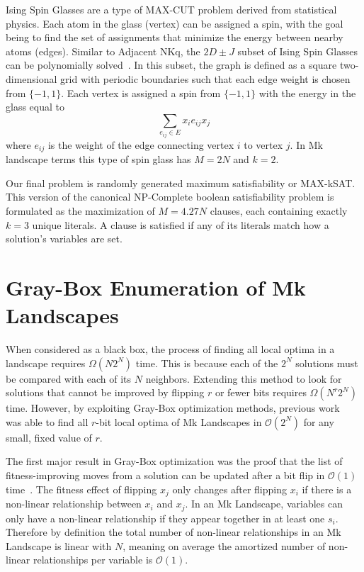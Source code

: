 \documentclass[runningheads,a4paper]{llncs}
\newcommand{\BigO}[1]{$\mathcal{O}{(#1)}$}
\begin{document}
Ising Spin Glasses are a type of MAX-CUT problem derived from statistical physics.
Each atom in the glass (vertex) can be assigned a spin, with the goal being to
find the set of assignments that minimize the energy between nearby atoms (edges).
Similar to Adjacent NKq, the $2D\pm J$ subset of Ising Spin Glasses can be polynomially
solved~\cite{saul:1994:spinglass}.
In this subset, the graph is defined as a square two-dimensional grid with
periodic boundaries such that each edge
weight is chosen from $\{-1, 1\}$. Each vertex is assigned a spin from $\{-1, 1\}$ with
the energy in the glass equal to
\begin{equation}
\sum_{e_{ij} \in E} x_ie_{ij}x_j
  \label{eq-ising}
\end{equation}
where $e_{ij}$ is the weight of the edge connecting vertex $i$ to vertex $j$. In Mk landscape terms
this type of spin glass has $M=2N$ and $k=2$.

Our final problem is randomly generated maximum satisfiability or MAX-kSAT.
This version of the canonical NP-Complete boolean satisfiability problem is formulated
as the maximization of $M=4.27N$ clauses, each containing exactly $k=3$ unique literals.
A clause is satisfied if any of its literals match how a solution's variables are set.

\section{Gray-Box Enumeration of Mk Landscapes}
\label{sec-gray-box}
When considered as a black box, the process of finding all local optima
in a landscape requires $\Omega(N2^N)$ time. This is because each
of the $2^N$ solutions must be compared with each of its $N$ neighbors.
Extending this method to look for solutions that cannot be improved by
flipping $r$ or fewer bits requires $\Omega(N^r2^N)$ time. However,
by exploiting Gray-Box optimization methods, previous work~\cite{ochoa:2015:crossovernetworks}
was able to find all $r$-bit local optima of Mk Landscapes in \BigO{2^N} for any small,
fixed value of $r$.

The first major result in Gray-Box optimization was the proof that the list
of fitness-improving moves from a solution can be updated after a bit flip in \BigO{1}
time~\cite{whitley:2012:constant}.
The fitness effect of flipping $x_j$ only changes after flipping $x_i$ if
there is a non-linear relationship between $x_i$ and $x_j$.
In an Mk Landscape, variables
can only have a non-linear relationship if they appear together in at least one $s_i$.
Therefore by definition the total number of non-linear
relationships in an Mk Landscape is linear with $N$, meaning on average the amortized
number of non-linear relationships per variable is \BigO{1}.
\end{document}
